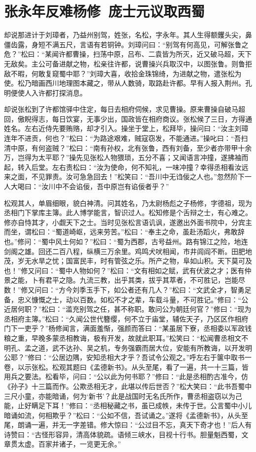 \chapter{张永年反难杨修~庞士元议取西蜀}

却说那进计于刘璋者，乃益州别驾，姓张，名松，字永年。其人生得额钁头尖，鼻僵齿露，身短不满五尺，言语有若铜钟。刘璋问曰：“别驾有何高见，可解张鲁之危？”松曰：“某闻许都曹操，扫荡中原，吕布、二袁皆为所灭，近又破马超，天下无敌矣。主公可备进献之物，松亲往许都，说曹操兴兵取汉中，以图张鲁。则鲁拒敌不暇，何敢复窥蜀中耶？”刘璋大喜，收拾金珠锦绮，为进献之物，遣张松为使。松乃暗画西川地理图本藏之，带从人数骑，取路赴许都。早有人报入荆州。孔明便使人入许都打探消息。

却说张松到了许都馆驿中住定，每日去相府伺候，求见曹操。原来曹操自破马超回，傲睨得志，每日饮宴，无事少出，国政皆在相府商议。张松候了三日，方得通姓名。左右近侍先要贿赂，却才引入。操坐于堂上，松拜毕，操问曰：“汝主刘璋连年不进贡，何也？”松曰：“为路途艰难，贼寇窃发，不能通进。”操叱曰：“吾扫清中原，有何盗贼？”松曰：“南有孙权，北有张鲁，西有刘备，至少者亦带甲十余万，岂得为太平耶？”操先见张松人物猥琐，五分不喜；又闻语言冲撞，遂拂袖而起，转入后堂。左右责松曰：“汝为使命，何不知礼，一味冲撞？幸得丞相看汝远来之面，不见罪责。汝可急急回去！”松笑曰：“吾川中无诌佞之人也。”忽然阶下一人大喝曰：“汝川中不会谄佞，吾中原岂有谄佞者乎？”

松观其人，单眉细眼，貌白神清。问其姓名，乃太尉杨彪之子杨修，字德祖，现为丞相门下掌库主簿。此人博学能言，智识过人。松知修是个舌辩之士，有心难之。修亦自恃其才，小觑天下之士。当时见张松言语讥讽，遂邀出外面书院中，分宾主而坐，谓松曰：“蜀道崎岖，远来劳苦。”松曰：“奉主之命，虽赴汤蹈火，弗敢辞也。”修问：“蜀中风土何如？”松曰：“蜀为西郡，古号益州。路有锦江之险，地连剑阁之雄。回还二百八程，纵横三万余里。鸡鸣犬吠相闻，市井闾阎不断。田肥地茂，岁无水旱之忧；国富民丰，时有管弦之乐。所产之物，阜如山积。天下莫可及也！”修又问曰：“蜀中人物如何？”松曰：“文有相如之赋，武有伏波之才；医有仲景之能，卜有君平之隐。九流三教，出乎其类，拔乎其萃者，不可胜记，岂能尽数！”修又问曰：“方今刘季玉手下，如公者还有几人？”松曰：“文武全才，智勇足备，忠义慷慨之士，动以百数。如松不才之辈，车载斗量，不可胜记。”修曰：“公近居何职？”松曰：“滥充别驾之任，甚不称职。敢问公为朝廷何官？”修曰：“现为丞相府主簿。”松曰：“久闻公世代簪缨，何不立于庙堂，辅佐天子，乃区区作相府门下一吏乎？”杨修闻言，满面羞惭，强颜而答曰：“某虽居下寮，丞相委以军政钱粮之重，早晚多蒙丞相教诲，极有开发，故就此职耳。”松笑曰：“松闻曹丞相文不明孔、孟之道，武不达孙、吴之机，专务强霸而居大位，安能有所教诲，以开发明公耶？”修曰：“公居边隅，安知丞相大才乎？吾试令公观之。”呼左右于箧中取书一卷，以示张松。松观其题曰《孟德新书》。从头至尾，看了一遍，共一十三篇，皆用兵之要法。松看毕，问曰：“公以此为何书耶？”修曰：“此是丞相酌古准今，仿《孙子》十三篇而作。公欺丞相无才，此堪以传后世否？”松大笑曰：“此书吾蜀中三尺小童，亦能暗诵，何为‘新书’？此是战国时无名氏所作，曹丞相盗窃以为己能，止好瞒足下耳！”修曰：“丞相秘藏之书，虽已成帙，未传于世。公言蜀中小儿暗诵如流，何相欺乎？”松曰：“公如不信，吾试诵之。”遂将《孟德新书》，从头至尾，朗诵一遍，并无一字差错。修大惊曰：“公过目不忘，真天下奇才也！”后人有诗赞曰：“古怪形容异，清高体貌疏。语倾三峡水，目视十行书。胆量魁西蜀，文章贯太虚。百家并诸子，一览更无余。”

